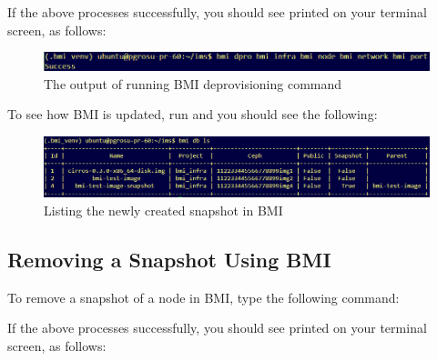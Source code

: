 If the above processes successfully, you should see  printed on your terminal screen, as follows: \\


\begin{figure}[!h] %
\label{fig:bmi-workflow}
\begin{center}
\includegraphics[scale=0.7]{figures/bmi-deprovisioning.png}
\end{center}
\caption{The output of running BMI deprovisioning command}
\end{figure}


To see how BMI is updated, run  and you should see the following: \\

\begin{figure}[!h] %
\label{fig:bmi-workflow}
\begin{center}
\includegraphics[scale=0.7]{figures/bmi-deprovisioning-db-ls.png}
\end{center}
\caption{Listing the newly created snapshot in BMI}
\end{figure}




\subsection{Removing a Snapshot Using BMI}

To remove a snapshot of a node in BMI, type the following command: 



If the above processes successfully, you should see  printed on your terminal screen, as follows: \\

